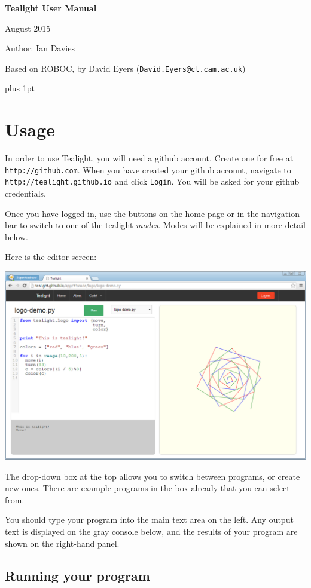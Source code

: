 \documentclass[12pt,a4paper,twoside]{article}
\renewcommand{\_}{\texttt{\symbol{95}}}
\begin{document}
\centerline{\textbf{\LARGE Tealight User Manual}}
\vspace{0.5cm}
\centerline{August 2015}
\centerline{Author: Ian Davies}
\centerline{Based on ROBOC, by David Eyers (\texttt{David.Eyers@cl.cam.ac.uk})}
{ \parskip 1mm plus 1pt \tableofcontents }


\newpage
\section{ Usage}

In order to use Tealight, you will need a github account. Create one for free at \verb^http://github.com^.
When you have created your github account, navigate to \verb^http://tealight.github.io^ and click \verb^Login^.
You will be asked for your github credentials.

Once you have logged in, use the buttons on the home page or in the navigation bar to switch to one of
the tealight \textit{modes}. Modes will be explained in more detail below.

Here is the editor screen:

\begin{center}
\includegraphics[scale=0.5,angle=0]{screenshots/ide/logo}
\end{center}

The drop-down box at the top allows you to switch between programs, or create new ones.
There are example programs in the box already that you can select from.

You should type your program into the main text area on the left. Any output text is displayed
on the gray console below, and the results of your program are shown on the right-hand panel.

\subsection{Running your program}
\end{document}
